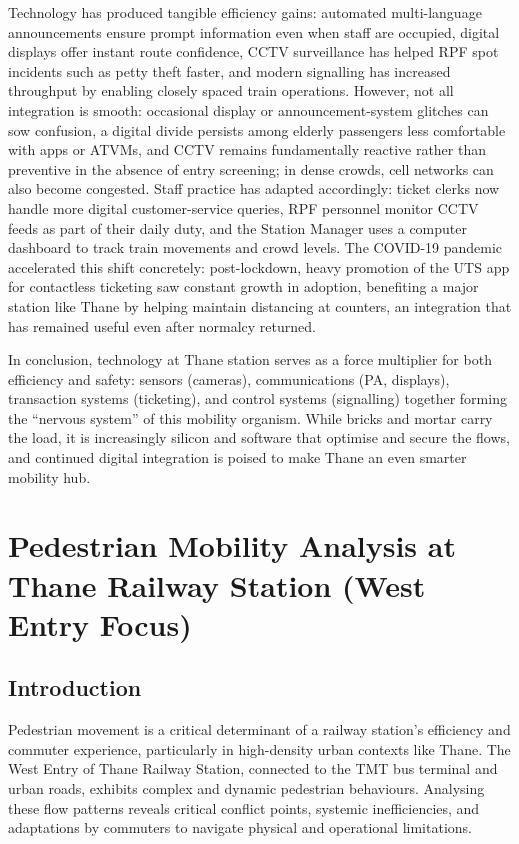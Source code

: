 \documentclass[11pt]{article}
\begin{document}
Technology has produced tangible efficiency gains: automated multi-language announcements ensure
prompt information even when staff are occupied, digital displays offer instant route
confidence, CCTV surveillance has helped RPF spot incidents such as petty theft faster, and
modern signalling has increased throughput by enabling closely spaced train operations. However,
not all integration is smooth: occasional display or announcement-system glitches can sow
confusion, a digital divide persists among elderly passengers less comfortable with apps or
ATVMs, and CCTV remains fundamentally reactive rather than preventive in the absence of entry
screening; in dense crowds, cell networks can also become congested. Staff practice has adapted
accordingly: ticket clerks now handle more digital customer-service queries, RPF personnel
monitor CCTV feeds as part of their daily duty, and the Station Manager uses a computer
dashboard to track train movements and crowd levels. The COVID-19 pandemic accelerated this
shift concretely: post-lockdown, heavy promotion of the UTS app for contactless ticketing saw
constant growth in adoption, benefiting a major station like Thane by helping maintain
distancing at counters, an integration that has remained useful even after normalcy returned.

In conclusion, technology at Thane station serves as a force multiplier for both efficiency and
safety: sensors (cameras), communications (PA, displays), transaction systems (ticketing), and
control systems (signalling) together forming the ``nervous system'' of this mobility organism.
While bricks and mortar carry the load, it is increasingly silicon and software that optimise
and secure the flows, and continued digital integration is poised to make Thane an even smarter
mobility hub.

\section{Pedestrian Mobility Analysis at Thane Railway Station (West Entry Focus)}

\subsection{Introduction}

Pedestrian movement is a critical determinant of a railway station's efficiency and commuter
experience, particularly in high-density urban contexts like Thane. The West Entry of Thane
Railway Station, connected to the TMT bus terminal and urban roads, exhibits complex and dynamic
pedestrian behaviours. Analysing these flow patterns reveals critical conflict points, systemic
inefficiencies, and adaptations by commuters to navigate physical and operational limitations.
\end{document}

